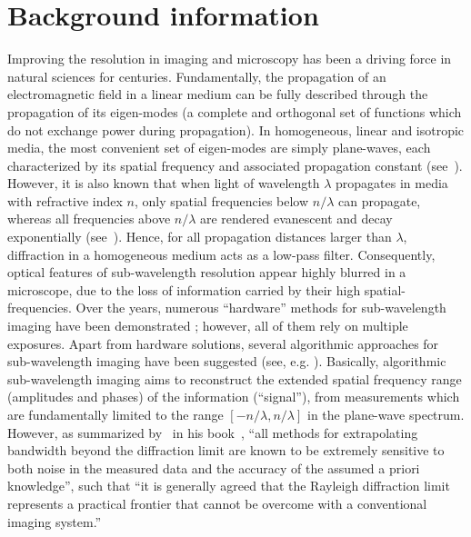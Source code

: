 \section{Background information}
\label{sec:sparse-background}
Improving the resolution in imaging and microscopy has been a driving
force in natural sciences for centuries. Fundamentally, the
propagation of an electromagnetic field in a linear medium can be
fully described through the propagation of its eigen-modes (a complete
and orthogonal set of functions which do not exchange power during
propagation). In homogeneous, linear and isotropic media, the most
convenient set of eigen-modes are simply plane-waves, each
characterized by its spatial frequency and associated propagation
constant (see~). However,
it is also known that when light of
wavelength $\lambda$ propagates in media with refractive index $n$,
only spatial frequencies below $n/\lambda$ can propagate, whereas all
frequencies above $n/\lambda$ are rendered evanescent and decay
exponentially (see~). Hence, for all propagation distances larger than
$\lambda$, diffraction in a homogeneous medium acts as a low-pass
filter. Consequently, optical features of sub-wavelength resolution
appear highly blurred in a microscope, due to the loss of information
carried by their high spatial-frequencies. Over the years, numerous
``hardware'' methods for sub-wavelength imaging have been demonstrated
;
however, all of them rely on multiple exposures. Apart from hardware
solutions, several algorithmic approaches for sub-wavelength imaging
have been suggested (see,
e.g. ). Basically,
algorithmic sub-wavelength imaging aims to reconstruct the extended
spatial frequency range (amplitudes and phases) of the information
(``signal''), from measurements which are fundamentally limited to the
range $[-n/\lambda, n/\lambda]$ in the plane-wave spectrum. However,
as summarized by~\citeauthor{goodman05introduction} in his
book~\citeyear{goodman05introduction}, ``all methods for extrapolating
bandwidth beyond the diffraction limit are known to be extremely
sensitive to both noise in the measured data and the accuracy of the
assumed a priori knowledge'', such that ``it is generally agreed that
the Rayleigh diffraction limit represents a practical frontier that
cannot be overcome with a conventional imaging system.''

